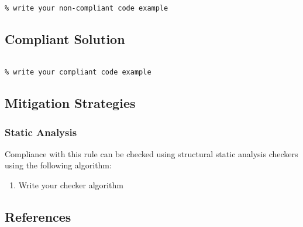 \begin{verbatim}

% write your non-compliant code example

\end{verbatim}

\subsection{Compliant Solution}


\begin{verbatim}

% write your compliant code example

\end{verbatim}

\subsection{Mitigation Strategies}
\subsubsection{Static Analysis} 

Compliance with this rule can be checked using structural static analysis checkers using the following algorithm:

\begin{enumerate}
\item Write your checker algorithm
\end{enumerate}

\subsection{References}


